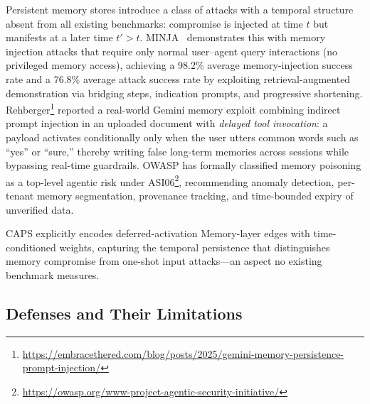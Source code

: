 Persistent memory stores introduce a class of attacks with a temporal
structure absent from all existing benchmarks: compromise is injected at
time $t$ but manifests at a later time $t' > t$.
MINJA~\cite{dong2025minja} demonstrates this with memory injection attacks
that require only normal user--agent query interactions (no privileged memory
access), achieving a 98.2\% average memory-injection success rate and a
76.8\% average attack success rate by exploiting retrieval-augmented
demonstration via bridging steps, indication prompts, and progressive
shortening.
Rehberger\footnote{\url{https://embracethered.com/blog/posts/2025/gemini-memory-persistence-prompt-injection/}} reported a real-world Gemini memory
exploit combining indirect prompt injection in an uploaded document with
\emph{delayed tool invocation}: a payload activates conditionally only when
the user utters common words such as ``yes'' or ``sure,'' thereby writing
false long-term memories across sessions while bypassing real-time guardrails.
OWASP has formally classified memory poisoning as a top-level agentic risk
under ASI06\footnote{\url{https://owasp.org/www-project-agentic-security-initiative/}}, recommending anomaly detection,
per-tenant memory segmentation, provenance tracking, and time-bounded expiry
of unverified data.

CAPS explicitly encodes deferred-activation Memory-layer edges with
time-conditioned weights, capturing the temporal persistence that
distinguishes memory compromise from one-shot input attacks---an
aspect no existing benchmark measures.


\subsection{Defenses and Their Limitations}

